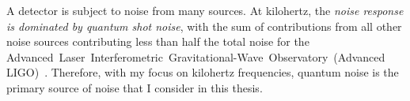 
A detector is subject to noise from many sources. %
At kilohertz, the \emph{noise response is dominated by quantum shot noise}, with the sum of contributions from all other noise sources contributing less than half the total noise for the Advanced~Laser~Interferometric~Gravitational-Wave~Observatory~(Advanced LIGO)~\cite{AdvancedLIGO:2015,buikemaSensitivityPerformanceAdvanced2020}. %
Therefore, with my focus on kilohertz frequencies, quantum noise is the primary source of noise that I consider in this thesis. %


